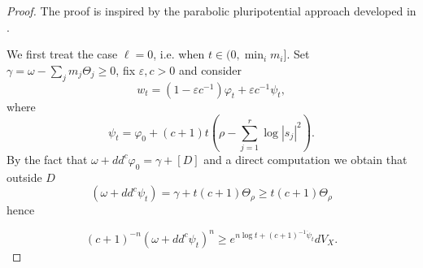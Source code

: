 \documentclass[10pt,a4paper]{amsart}
\numberwithin{equation}{section}
\begin{document}
\begin{proof}
The proof is inspired by the parabolic pluripotential approach developed in \cite{GLZ20}.

We first treat the case $\ell=0$, i.e. when $t \in (0, \min_i m_i]$.
Set $\gamma = \omega-\sum_jm_j\Theta_j \geq 0$,
fix $\varepsilon,c>0 $ and consider 
	\[
	w_t = (1-\varepsilon c^{-1}) \varphi_t + \varepsilon c^{-1}  \psi_t,
	\]
	where 
	\[
	\psi_t = \varphi_0 + (c+1)t \left(\rho-\sum_{j=1}^r \log|s_j|^2\right). 
	\]
By the fact that $\omega+dd^c \varphi_0=\gamma+[D]$ and a direct computation we obtain that outside $D$
	\[
	(\omega+dd^c \psi_t) = \gamma + t (c+1)\Theta_\rho \geq t (c+1) \Theta_\rho
	\]
	hence

	\[
	(c+1)^{-n}(\omega+dd^c \psi_t)^n \geq e^{n\log t+ (c+1)^{-1}\dot{\psi}_t} dV_X. 
	\]
	

\end{proof}
\end{document}
